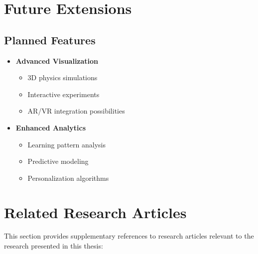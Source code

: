\section{Future Extensions}
\label{sec:future-extensions}

\subsection{Planned Features}
\begin{itemize}
    \item \textbf{Advanced Visualization}
        \begin{itemize}
            \item 3D physics simulations
            \item Interactive experiments
            \item AR/VR integration possibilities
        \end{itemize}
    
    \item \textbf{Enhanced Analytics}
        \begin{itemize}
            \item Learning pattern analysis
            \item Predictive modeling
            \item Personalization algorithms
        \end{itemize}
\end{itemize}

\section{Related Research Articles}
\label{sec:related-research}

This section provides supplementary references to research articles relevant to the research presented in this thesis:

